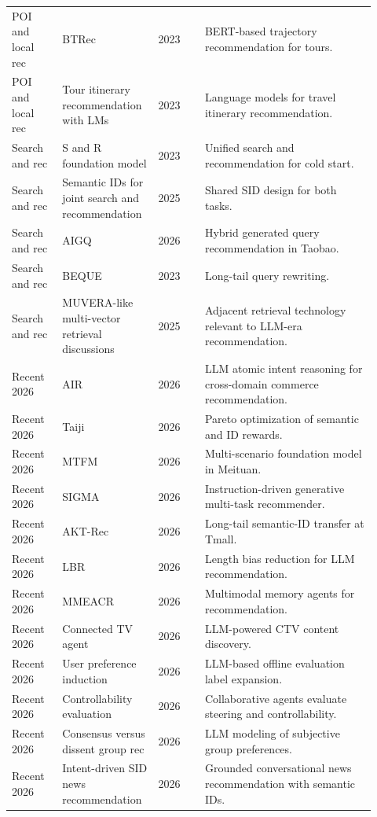 \documentclass[11pt]{article}
\begin{document}
\begin{longtable}{@{}p{0.13\linewidth}p{0.23\linewidth}p{0.12\linewidth}p{0.44\linewidth}@{}}
POI and local rec & BTRec & 2023 & BERT-based trajectory recommendation for tours.\\
POI and local rec & Tour itinerary recommendation with LMs & 2023 & Language models for travel itinerary recommendation.\\
Search and rec & S and R foundation model & 2023 & Unified search and recommendation for cold start.\\
Search and rec & Semantic IDs for joint search and recommendation & 2025 & Shared SID design for both tasks.\\
Search and rec & AIGQ & 2026 & Hybrid generated query recommendation in Taobao.\\
Search and rec & BEQUE & 2023 & Long-tail query rewriting.\\
Search and rec & MUVERA-like multi-vector retrieval discussions & 2025 & Adjacent retrieval technology relevant to LLM-era recommendation.\\
Recent 2026 & AIR & 2026 & LLM atomic intent reasoning for cross-domain commerce recommendation.\\
Recent 2026 & Taiji & 2026 & Pareto optimization of semantic and ID rewards.\\
Recent 2026 & MTFM & 2026 & Multi-scenario foundation model in Meituan.\\
Recent 2026 & SIGMA & 2026 & Instruction-driven generative multi-task recommender.\\
Recent 2026 & AKT-Rec & 2026 & Long-tail semantic-ID transfer at Tmall.\\
Recent 2026 & LBR & 2026 & Length bias reduction for LLM recommendation.\\
Recent 2026 & MMEACR & 2026 & Multimodal memory agents for recommendation.\\
Recent 2026 & Connected TV agent & 2026 & LLM-powered CTV content discovery.\\
Recent 2026 & User preference induction & 2026 & LLM-based offline evaluation label expansion.\\
Recent 2026 & Controllability evaluation & 2026 & Collaborative agents evaluate steering and controllability.\\
Recent 2026 & Consensus versus dissent group rec & 2026 & LLM modeling of subjective group preferences.\\
Recent 2026 & Intent-driven SID news recommendation & 2026 & Grounded conversational news recommendation with semantic IDs.\\
\bottomrule
\end{longtable}
\normalsize
\end{document}
